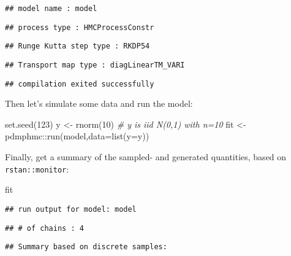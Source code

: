 \documentclass[
]{book}
\newenvironment{Shaded}{\begin{snugshade}}{\end{snugshade}}
\newcommand{\AttributeTok}[1]{\textcolor[rgb]{0.77,0.63,0.00}{#1}}
\newcommand{\CommentTok}[1]{\textcolor[rgb]{0.56,0.35,0.01}{\textit{#1}}}
\newcommand{\DecValTok}[1]{\textcolor[rgb]{0.00,0.00,0.81}{#1}}
\newcommand{\FunctionTok}[1]{\textcolor[rgb]{0.00,0.00,0.00}{#1}}
\newcommand{\NormalTok}[1]{#1}
\newcommand{\OtherTok}[1]{\textcolor[rgb]{0.56,0.35,0.01}{#1}}
\newcommand{\SpecialCharTok}[1]{\textcolor[rgb]{0.00,0.00,0.00}{#1}}
\begin{document}
\begin{verbatim}
## model name : model
\end{verbatim}

\begin{verbatim}
## process type : HMCProcessConstr
\end{verbatim}

\begin{verbatim}
## Runge Kutta step type : RKDP54
\end{verbatim}

\begin{verbatim}
## Transport map type : diagLinearTM_VARI
\end{verbatim}

\begin{verbatim}
## compilation exited successfully
\end{verbatim}

Then let's simulate some data and run the model:

\begin{Shaded}
\begin{Highlighting}[]
\FunctionTok{set.seed}\NormalTok{(}\DecValTok{123}\NormalTok{)}
\NormalTok{y }\OtherTok{\textless{}{-}} \FunctionTok{rnorm}\NormalTok{(}\DecValTok{10}\NormalTok{) }\CommentTok{\# y is iid N(0,1) with n=10}
\NormalTok{fit }\OtherTok{\textless{}{-}}\NormalTok{ pdmphmc}\SpecialCharTok{::}\FunctionTok{run}\NormalTok{(model,}\AttributeTok{data=}\FunctionTok{list}\NormalTok{(}\AttributeTok{y=}\NormalTok{y))}
\end{Highlighting}
\end{Shaded}

Finally, get a summary of the sampled- and generated quantities, based on \texttt{rstan::monitor}:

\begin{Shaded}
\begin{Highlighting}[]
\NormalTok{fit}
\end{Highlighting}
\end{Shaded}

\begin{verbatim}
## run output for model: model
\end{verbatim}

\begin{verbatim}
## # of chains : 4
\end{verbatim}

\begin{verbatim}
## Summary based on discrete samples:
\end{verbatim}
\end{document}
